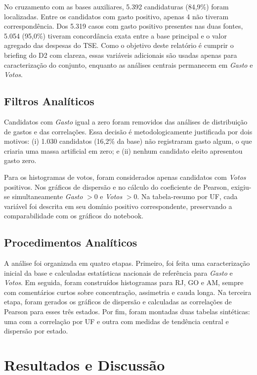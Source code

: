 \documentclass[conference]{IEEEtran}
\begin{document}
No cruzamento com as bases auxiliares, 5.392 candidaturas (84,9\%) foram
localizadas. Entre os candidatos com gasto positivo, apenas 4 não tiveram
correspondência. Dos 5.319 casos com gasto positivo presentes nas duas
fontes, 5.054 (95,0\%) tiveram concordância exata entre a base principal e o
valor agregado das despesas do TSE. Como o objetivo deste relatório é
cumprir o briefing do D2 com clareza, essas variáveis adicionais são usadas
apenas para caracterização do conjunto, enquanto as análises centrais
permanecem em \textit{Gasto} e \textit{Votos}.

\subsection{Filtros Analíticos}

Candidatos com \textit{Gasto} igual a zero foram removidos das análises de
distribuição de gastos e das correlações. Essa decisão é metodologicamente
justificada por dois motivos: (i) 1.030 candidatos (16,2\% da base) não
registraram gasto algum, o que criaria uma massa artificial em zero; e (ii)
nenhum candidato eleito apresentou gasto zero.

Para os histogramas de votos, foram considerados apenas candidatos com
\textit{Votos} positivos. Nos gráficos de dispersão e no cálculo do
coeficiente de Pearson, exigiu-se simultaneamente \textit{Gasto} $> 0$ e
\textit{Votos} $> 0$. Na tabela-resumo por UF, cada variável foi descrita em
seu domínio positivo correspondente, preservando a comparabilidade com os
gráficos do notebook.

\subsection{Procedimentos Analíticos}

A análise foi organizada em quatro etapas. Primeiro, foi feita uma
caracterização inicial da base e calculadas estatísticas nacionais de
referência para \textit{Gasto} e \textit{Votos}. Em seguida, foram
construídos histogramas para RJ, GO e AM, sempre com comentários curtos sobre
concentração, assimetria e cauda longa. Na terceira etapa, foram gerados os
gráficos de dispersão e calculadas as correlações de Pearson para esses três
estados. Por fim, foram montadas duas tabelas sintéticas: uma com a
correlação por UF e outra com medidas de tendência central e dispersão por
estado.

\section{Resultados e Discussão}
\end{document}
